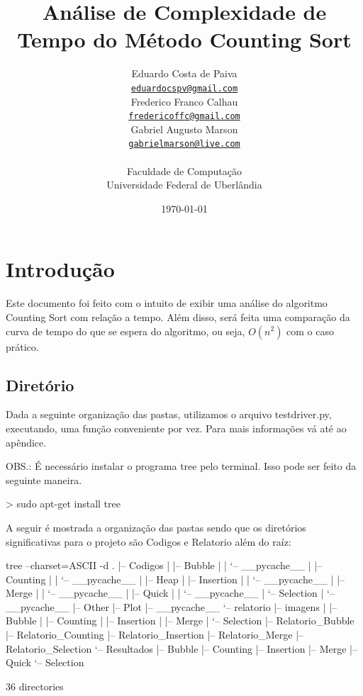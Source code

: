 \documentclass[12pt,a4paper,twoside]{report}
\title{Análise de Complexidade de Tempo do Método Counting Sort}
\date{}
\author{Eduardo Costa de Paiva \\
\texttt{\small \url{eduardocspv@gmail.com}}\\
Frederico Franco Calhau \\
\texttt{\small \url{fredericoffc@gmail.com}}\\
Gabriel Augusto Marson \\
\texttt{\small \url{gabrielmarson@live.com}}\\
\vspace{1cm} \\
Faculdade de Computação \\
Universidade Federal de Uberlândia
}
\date{\today}
\begin{document}
  \maketitle
\listoffigures
\listoftables
\lstlistoflistings

\tableofcontents


\fancyhead[RE,LO]{\thesection}

\setlength{\parskip}{0.15in} %

\chapter{Introdução}
Este documento foi feito com o intuito de exibir uma análise do algoritmo Counting Sort
com relação a tempo. Além disso, será feita uma comparação da curva de tempo do que se espera do
algoritmo, ou seja, $O(n^2)$ com o caso prático.

\section{Diretório}

Dada a seguinte organização das pastas, utilizamos o arquivo testdriver.py,  executando, uma função conveniente por vez. Para mais informações vá até ao apêndice.

OBS.: É necessário instalar o programa tree pelo terminal. Isso pode ser feito da seguinte maneira.

\begin{terminal}
> sudo apt-get install tree
\end{terminal}

A seguir é mostrada a organização das pastas sendo que os diretórios significativas para o projeto são Codigos e Relatorio além do raíz:
\begin{terminal}

tree --charset=ASCII -d
.
|-- Codigos
|   |-- Bubble
|   |   `-- __pycache__
|   |-- Counting
|   |   `-- __pycache__
|   |-- Heap
|   |-- Insertion
|   |   `-- __pycache__
|   |-- Merge
|   |   `-- __pycache__
|   |-- Quick
|   |   `-- __pycache__
|   `-- Selection
|       `-- __pycache__
|-- Other
|-- Plot
|-- __pycache__
`-- relatorio
    |-- imagens
    |   |-- Bubble
    |   |-- Counting
    |   |-- Insertion
    |   |-- Merge
    |   `-- Selection
    |-- Relatorio_Bubble
    |-- Relatorio_Counting
    |-- Relatorio_Insertion
    |-- Relatorio_Merge
    |-- Relatorio_Selection
    `-- Resultados
        |-- Bubble
        |-- Counting
        |-- Insertion
        |-- Merge
        |-- Quick
        `-- Selection

36 directories


\end{terminal}
\end{document}
